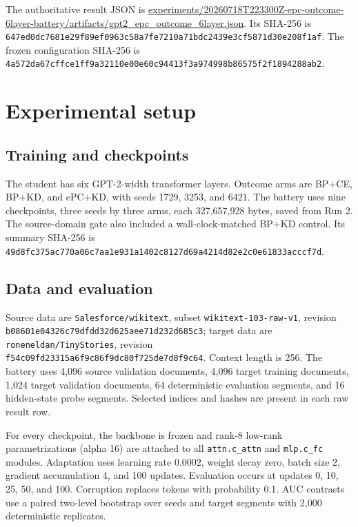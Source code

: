 \documentclass[11pt]{article}
\begin{document}
The authoritative result JSON is \url{experiments/20260718T223300Z-epc-outcome-6layer-battery/artifacts/gpt2_epc_outcome_6layer.json}. Its SHA-256 is {\scriptsize\texttt{647ed0dc7681e29f}\allowbreak\texttt{89ef0963c58a7fe7}\allowbreak\texttt{210a71bdc2439e3c}\allowbreak\texttt{f5871d30e208f1af}}. The frozen configuration SHA-256 is {\scriptsize\texttt{4a572da67cffce1f}\allowbreak\texttt{f9a32110e00e60c9}\allowbreak\texttt{4413f3a974998b86}\allowbreak\texttt{575f2f1894288ab2}}.

\section{Experimental setup}
\subsection{Training and checkpoints}
The student has six GPT-2-width transformer layers. Outcome arms are BP+CE, BP+KD, and ePC+KD, with seeds 1729, 3253, and 6421. The battery uses nine checkpoints, three seeds by three arms, each 327,657,928 bytes, saved from Run 2. The source-domain gate also included a wall-clock-matched BP+KD control. Its summary SHA-256 is {\scriptsize\texttt{49d8fc375ac770a0}\allowbreak\texttt{6c7aa1e931a1402c}\allowbreak\texttt{8127d69a4214d82e}\allowbreak\texttt{2c0e61833acccf7d}}.

\subsection{Data and evaluation}
Source data are \texttt{Salesforce/wikitext}, subset \texttt{wikitext-103-raw-v1}, revision {\scriptsize\texttt{b08601e04326c79d}\allowbreak\texttt{fdd32d625aee71d2}\allowbreak\texttt{32d685c3}}; target data are \texttt{roneneldan/TinyStories}, revision {\scriptsize\texttt{f54c09fd23315a6f}\allowbreak\texttt{9c86f9dc80f725de}\allowbreak\texttt{7d8f9c64}}. Context length is 256. The battery uses 4,096 source validation documents, 4,096 target training documents, 1,024 target validation documents, 64 deterministic evaluation segments, and 16 hidden-state probe segments. Selected indices and hashes are present in each raw result row.

For every checkpoint, the backbone is frozen and rank-8 low-rank parametrizations (alpha 16) are attached to all \texttt{attn.c\_attn} and \texttt{mlp.c\_fc} modules. Adaptation uses learning rate 0.0002, weight decay zero, batch size 2, gradient accumulation 4, and 100 updates. Evaluation occurs at updates 0, 10, 25, 50, and 100. Corruption replaces tokens with probability 0.1. AUC contrasts use a paired two-level bootstrap over seeds and target segments with 2,000 deterministic replicates.
\end{document}
